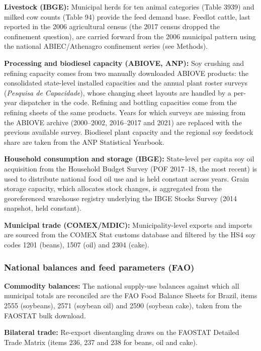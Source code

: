 \documentclass[pdflatex,sn-nature]{sn-jnl}%
\begin{document}
\textbf{Livestock (IBGE):} Municipal herds for ten animal categories (Table 3939) and milked cow counts (Table 94) provide the feed demand base. Feedlot cattle, last reported in the 2006 agricultural census (the 2017 census dropped the confinement question), are carried forward from the 2006 municipal pattern using the national ABIEC/Athenagro confinement series (see Methods).

\textbf{Processing and biodiesel capacity (ABIOVE, ANP):} Soy crushing and
refining capacity comes from two manually downloaded ABIOVE products: the
consolidated state-level installed capacities and the annual plant roster
surveys (\emph{Pesquisa de Capacidade}), whose changing sheet layouts are
handled by a per-year dispatcher in the code. Refining and bottling
capacities come from the refining sheets of the same products. Years for which surveys are missing from the ABIOVE archive (2000–2002, 2016–2017 and 2021) are replaced with the previous available survey. Biodiesel plant capacity and the regional soy feedstock share are taken from the ANP Statistical Yearbook.

\textbf{Household consumption and storage (IBGE):} State-level per capita soy oil acquisition from the Household Budget Survey (POF 2017–18, the most recent) is used to distribute national food oil use and is held constant across years. Grain storage capacity, which allocates stock changes, is aggregated from the georeferenced warehouse registry underlying the IBGE Stocks Survey (2014 snapshot, held constant).

\textbf{Municipal trade (COMEX/MDIC):} Municipality-level exports and imports are sourced from the COMEX Stat customs database and filtered by the HS4 soy codes 1201 (beans), 1507 (oil) and 2304 (cake).

\subsubsection{National balances and feed parameters (FAO)}\label{subsec:fao}

\textbf{Commodity balances:} The national supply-use balances against which all municipal totals are reconciled are the FAO Food Balance Sheets for Brazil, items 2555 (soybeans), 2571 (soybean oil) and 2590 (soybean cake), taken from the FAOSTAT bulk download.

\textbf{Bilateral trade:} Re-export disentangling draws on the FAOSTAT
Detailed Trade Matrix (items 236, 237 and 238 for beans, oil and cake).
\end{document}
